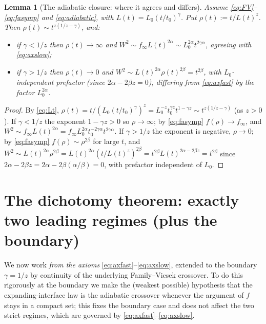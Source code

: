 \documentclass{amsart}
\newtheorem{lemma}{Lemma}
\theoremstyle{definition}
\newcommand{\asymp}{\sim}
\begin{document}
\begin{lemma}[The adiabatic closure: where it agrees and differs]\label{lem:adiab}
Assume \eqref{eq:FV}--\eqref{eq:fasymp} and \eqref{eq:adiabatic}, with
$L(t)=L_0(t/t_0)^{\gamma}$. Put $\rho(t):=t/L(t)^{z}$. Then
$\rho(t)\asymp t^{z(1/z-\gamma)}$, and:
\begin{itemize}
\item if $\gamma<1/z$ then $\rho(t)\to\infty$ and
  $W^2\asymp f_\infty L(t)^{2\alpha}\asymp L_0^{2\alpha}t^{2\gamma\alpha}$,
  agreeing with \eqref{eq:axslow};
\item if $\gamma>1/z$ then $\rho(t)\to0$ and
  $W^2\asymp L(t)^{2\alpha}\rho(t)^{2\beta}=t^{2\beta}$, with $L_0$-independent
  prefactor (since $2\alpha-2\beta z=0$), differing from \eqref{eq:axfast} by the
  factor $L_0^{2\alpha}$.
\end{itemize}
\end{lemma}
\begin{proof}
By \eqref{eq:Lt},
$\rho(t)=t/(L_0(t/t_0)^{\gamma})^{z}=L_0^{-z}t_0^{\gamma z}t^{1-\gamma z}
\asymp t^{z(1/z-\gamma)}$ (as $z>0$). If $\gamma<1/z$ the exponent $1-\gamma z>0$ so
$\rho\to\infty$; by \eqref{eq:fasymp} $f(\rho)\to f_\infty$, and
$W^2\asymp f_\infty L(t)^{2\alpha}=f_\infty L_0^{2\alpha}t_0^{-2\gamma\alpha}t^{2\gamma\alpha}$.
If $\gamma>1/z$ the exponent is negative, $\rho\to0$; by \eqref{eq:fasymp}
$f(\rho)\asymp\rho^{2\beta}$ for large $t$, and
$W^2\asymp L(t)^{2\alpha}\rho^{2\beta}=L(t)^{2\alpha}(t/L(t)^z)^{2\beta}
=t^{2\beta}L(t)^{2\alpha-2\beta z}=t^{2\beta}$ since $2\alpha-2\beta z
=2\alpha-2\beta(\alpha/\beta)=0$, with prefactor independent of $L_0$.
\end{proof}

\section{The dichotomy theorem: exactly two leading regimes (plus the boundary)}
\label{sec:dichotomy}

We now work \emph{from the axioms} \eqref{eq:axfast}--\eqref{eq:axslow}, extended to
the boundary $\gamma=1/z$ by continuity of the underlying Family--Vicsek crossover.
To do this rigorously at the boundary we make the (weakest possible) hypothesis that
the expanding-interface law is the adiabatic crossover whenever the argument of $f$
stays in a compact set; this fixes the boundary case and does not affect the two
strict regimes, which are governed by \eqref{eq:axfast}--\eqref{eq:axslow}.
\end{document}
